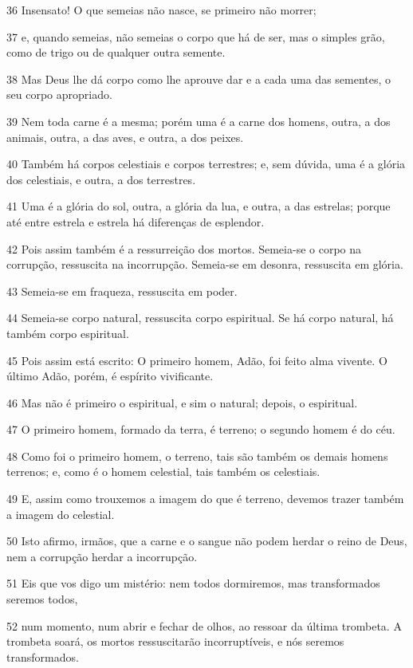 \par 36 Insensato! O que semeias não nasce, se primeiro não morrer;
\par 37 e, quando semeias, não semeias o corpo que há de ser, mas o simples grão, como de trigo ou de qualquer outra semente.
\par 38 Mas Deus lhe dá corpo como lhe aprouve dar e a cada uma das sementes, o seu corpo apropriado.
\par 39 Nem toda carne é a mesma; porém uma é a carne dos homens, outra, a dos animais, outra, a das aves, e outra, a dos peixes.
\par 40 Também há corpos celestiais e corpos terrestres; e, sem dúvida, uma é a glória dos celestiais, e outra, a dos terrestres.
\par 41 Uma é a glória do sol, outra, a glória da lua, e outra, a das estrelas; porque até entre estrela e estrela há diferenças de esplendor.
\par 42 Pois assim também é a ressurreição dos mortos. Semeia-se o corpo na corrupção, ressuscita na incorrupção. Semeia-se em desonra, ressuscita em glória.
\par 43 Semeia-se em fraqueza, ressuscita em poder.
\par 44 Semeia-se corpo natural, ressuscita corpo espiritual. Se há corpo natural, há também corpo espiritual.
\par 45 Pois assim está escrito: O primeiro homem, Adão, foi feito alma vivente. O último Adão, porém, é espírito vivificante.
\par 46 Mas não é primeiro o espiritual, e sim o natural; depois, o espiritual.
\par 47 O primeiro homem, formado da terra, é terreno; o segundo homem é do céu.
\par 48 Como foi o primeiro homem, o terreno, tais são também os demais homens terrenos; e, como é o homem celestial, tais também os celestiais.
\par 49 E, assim como trouxemos a imagem do que é terreno, devemos trazer também a imagem do celestial.
\par 50 Isto afirmo, irmãos, que a carne e o sangue não podem herdar o reino de Deus, nem a corrupção herdar a incorrupção.
\par 51 Eis que vos digo um mistério: nem todos dormiremos, mas transformados seremos todos,
\par 52 num momento, num abrir e fechar de olhos, ao ressoar da última trombeta. A trombeta soará, os mortos ressuscitarão incorruptíveis, e nós seremos transformados.
